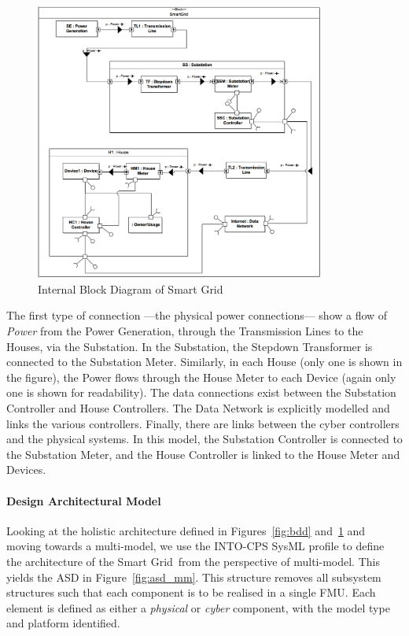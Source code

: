\begin{figure}
\centering
\includegraphics[width=0.85\textwidth]{figures/IBDSmartGrid}
\caption{Internal Block Diagram of Smart Grid}
\label{fig:ibd}
\end{figure}

The first type of connection ---the physical power connections--- show a flow of \textit{Power} from the Power Generation, through the Transmission Lines to the Houses, via the Substation. In the Substation, the Stepdown Transformer is connected to the Substation Meter. Similarly, in each House (only one is shown in the figure), the Power flows through the House Meter to each Device (again only one is shown for readability). The data connections exist between the Substation Controller and House Controllers. The Data Network is explicitly modelled and links the various controllers. Finally, there are links between the cyber controllers and the physical systems. In this model, the Substation Controller is connected to the Substation Meter, and the House Controller is linked to the House Meter and Devices.

\paragraph{Design Architectural Model}


Looking at the holistic architecture defined in Figures~\ref{fig:bdd} and~\ref{fig:ibd} and moving towards a multi-model, we use the INTO-CPS SysML profile to define the architecture of the Smart Grid\ from the perspective of multi-model. This yields the ASD in Figure~\ref{fig:asd_mm}. This structure removes all subsystem structures such that each component is to be realised in a single FMU. Each element is defined as either a \emph{physical} or \emph{cyber} component, with the model type and platform identified.

